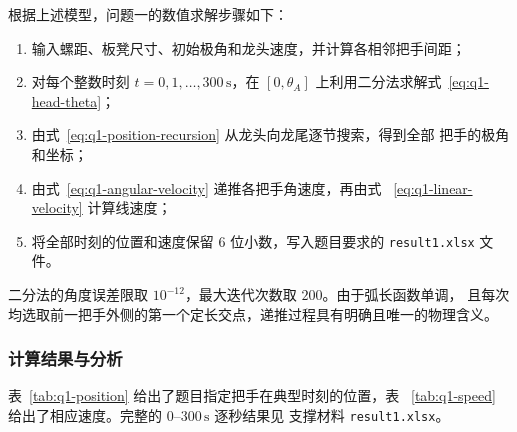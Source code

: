 \documentclass[UTF8,fontset=windows,a4paper,12pt]{ctexart}
\begin{document}
根据上述模型，问题一的数值求解步骤如下：
\begin{enumerate}
  \item 输入螺距、板凳尺寸、初始极角和龙头速度，并计算各相邻把手间距；
  \item 对每个整数时刻 $t=0,1,\ldots,300\,\mathrm{s}$，在
  $[0,\theta_A]$ 上利用二分法求解式~\eqref{eq:q1-head-theta}；
  \item 由式~\eqref{eq:q1-position-recursion} 从龙头向龙尾逐节搜索，得到全部
  把手的极角和坐标；
  \item 由式~\eqref{eq:q1-angular-velocity} 递推各把手角速度，再由式
  ~\eqref{eq:q1-linear-velocity} 计算线速度；
  \item 将全部时刻的位置和速度保留 $6$ 位小数，写入题目要求的
  \texttt{result1.xlsx} 文件。
\end{enumerate}
二分法的角度误差限取 $10^{-12}$，最大迭代次数取 $200$。由于弧长函数单调，
且每次均选取前一把手外侧的第一个定长交点，递推过程具有明确且唯一的物理含义。

\subsubsection{计算结果与分析}

表~\ref{tab:q1-position} 给出了题目指定把手在典型时刻的位置，表
~\ref{tab:q1-speed} 给出了相应速度。完整的 $0$--$300\,\mathrm{s}$ 逐秒结果见
支撑材料 \texttt{result1.xlsx}。
\end{document}
